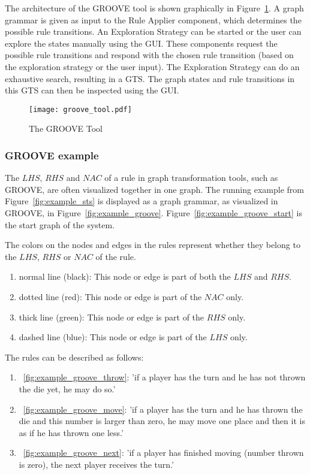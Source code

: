The architecture of the GROOVE tool is shown graphically in Figure~\ref{fig:groove_tool}. A graph grammar is given as input to the Rule Applier component, which determines the possible rule transitions. An Exploration Strategy can be started or the user can explore the states manually using the GUI. These components request the possible rule transitions and respond with the chosen rule transition (based on the exploration strategy or the user input). The Exploration Strategy can do an exhaustive search, resulting in a GTS. The graph states and rule transitions in this GTS can then be inspected using the GUI.

\begin{figure}[ht]
  \begin{center}
    \texttt{[image: groove\_tool.pdf]}
  \end{center}
  \caption{The GROOVE Tool}
  \label{fig:groove_tool}
\end{figure}

\subsubsection{GROOVE example}
The $\mathit{LHS}$, $\mathit{RHS}$ and $\mathit{NAC}$ of a rule in graph transformation tools, such as GROOVE, are often visualized together in one graph. The running example from Figure~\ref{fig:example_sts} is displayed as a graph grammar, as visualized in GROOVE, in Figure~\ref{fig:example_groove}. Figure~\ref{fig:example_groove_start} is the start graph of the system.

The colors on the nodes and edges in the rules represent whether they belong to the $\mathit{LHS}$, $\mathit{RHS}$ or $\mathit{NAC}$ of the rule.
\begin{enumerate}
  \item normal line (black): This node or edge is part of both the $\mathit{LHS}$ and $\mathit{RHS}$.
  \item dotted line (red): This node or edge is part of the $\mathit{NAC}$ only.
  \item thick line (green): This node or edge is part of the $\mathit{RHS}$ only.
  \item dashed line (blue): This node or edge is part of the $\mathit{LHS}$ only.
\end{enumerate}

The rules can be described as follows:
\begin{enumerate}
  \item~\ref{fig:example_groove_throw}: 'if a player has the turn and he has not thrown the die yet, he may do so.'
  \item~\ref{fig:example_groove_move}: 'if a player has the turn and he has thrown the die and this number is larger than zero, he may move one place and then it is as if he has thrown one less.'
  \item~\ref{fig:example_groove_next}: 'if a player has finished moving (number thrown is zero), the next player receives the turn.'
\end{enumerate}

